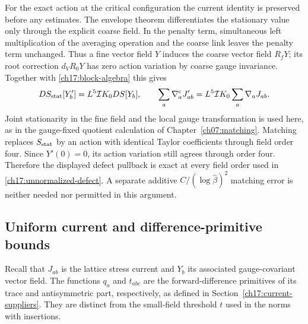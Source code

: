 For the exact action at the critical configuration the current identity is preserved before
any estimates. The envelope theorem differentiates the stationary value
only through the explicit coarse field. In the penalty term, simultaneous
left multiplication of the averaging operation and the coarse link leaves the
penalty term unchanged. Thus a fine vector field $Y$ induces the coarse
vector field $R_fY$; its root correction $d_VR_0Y$ has zero action
variation by coarse gauge invariance. Together with
\eqref{ch17:block-algebra} this gives
\[
 DS_{\rm stat}[Y'_b]
  =L^5\mathcal I K_0DS[Y_b],\qquad
 \sum_a\nabla_a^{\rm c}J'_{ab}
  =L^5\mathcal I K_0\sum_a\nabla_aJ_{ab}.
\]
Joint stationarity in the fine field and the local gauge transformation is used here, as in the gauge-fixed
quotient calculation of Chapter~\ref{ch07:matching}. Matching replaces
$S_{\rm stat}$ by an action with identical Taylor coefficients through
field order four. Since $Y'(0)=0$, its action variation still agrees
through order four. Therefore the displayed defect pullback is exact
at every field order used in \eqref{ch17:unnormalized-defect}.
A separate additive $C/(\log\widehat\beta)^2$ matching error is neither
needed nor permitted in this argument.

\subsection{Uniform current and difference-primitive bounds}

Recall that $J_{ab}$ is the lattice stress current and $Y_b$ its
associated gauge-covariant vector field. The functions $q_a$ and
$t_{abc}$ are the forward-difference primitives of its trace and
antisymmetric part, respectively, as defined in
Section~\ref{ch17:current-suppliers}. They are distinct from the
small-field threshold $t$ used in the norms with insertions.

